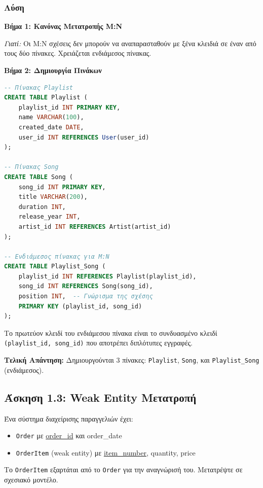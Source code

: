 \subsubsection*{Λύση}

\textbf{Βήμα 1: Κανόνας Μετατροπής M:N}

\textit{Γιατί:} Οι M:N σχέσεις δεν μπορούν να αναπαρασταθούν με ξένα κλειδιά σε έναν
από τους δύο πίνακες. Χρειάζεται ενδιάμεσος πίνακας.

\textbf{Βήμα 2: Δημιουργία Πινάκων}

\begin{lstlisting}[language=SQL]
-- Πίνακας Playlist
CREATE TABLE Playlist (
    playlist_id INT PRIMARY KEY,
    name VARCHAR(100),
    created_date DATE,
    user_id INT REFERENCES User(user_id)
);

-- Πίνακας Song
CREATE TABLE Song (
    song_id INT PRIMARY KEY,
    title VARCHAR(200),
    duration INT,
    release_year INT,
    artist_id INT REFERENCES Artist(artist_id)
);

-- Ενδιάμεσος πίνακας για M:N
CREATE TABLE Playlist_Song (
    playlist_id INT REFERENCES Playlist(playlist_id),
    song_id INT REFERENCES Song(song_id),
    position INT,  -- Γνώρισμα της σχέσης
    PRIMARY KEY (playlist_id, song_id)
);
\end{lstlisting}

\begin{infobox}[Σημαντικό]
Το πρωτεύον κλειδί του ενδιάμεσου πίνακα είναι το συνδυασμένο κλειδί
\texttt{(playlist\_id, song\_id)} που αποτρέπει διπλότυπες εγγραφές.
\end{infobox}

\textbf{Τελική Απάντηση:} Δημιουργούνται 3 πίνακες: \texttt{Playlist}, \texttt{Song},
και \texttt{Playlist\_Song} (ενδιάμεσος).

\subsection{Άσκηση 1.3: Weak Entity Μετατροπή}

\begin{formulabox}[Εκφώνηση]
Ένα σύστημα διαχείρισης παραγγελιών έχει:
\begin{itemize}
    \item \texttt{Order} με \underline{order\_id} και order\_date
    \item \texttt{OrderItem} (weak entity) με \underline{item\_number}, quantity, price
\end{itemize}
Το \texttt{OrderItem} εξαρτάται από το \texttt{Order} για την αναγνώρισή του.
Μετατρέψτε σε σχεσιακό μοντέλο.
\end{formulabox}

